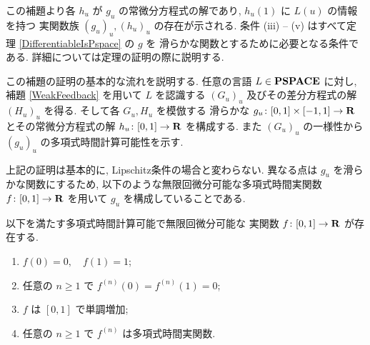  この補題より各 $h_u$ が $g_u$ の常微分方程式の解であり, 
 $h_u(1)$ に $L(u)$ の情報を持つ
 実関数族 $(g_u)_u, (h_u)_u$ の存在が示される.
 条件 (iii) -- (v) はすべて定理 \ref{DifferentiableIsPspace} の $g$ を
 滑らかな関数とするために必要となる条件である.
 詳細については定理の証明の際に説明する.
 

 この補題の証明の基本的な流れを説明する.
 任意の言語 $L \in \mathbf{PSPACE}$ に対し, 
 補題 \ref{WeakFeedback} を用いて $L$ を認識する $(G_u)_u$ 
 及びその差分方程式の解 $(H_u)_u$ を得る.
 そして各 $G_u, H_u$ を模倣する
 滑らかな $g_u \colon [0,1] \times [-1, 1] \to \mathbf R$ 
 とその常微分方程式の解 $h_u \colon [0,1] \to \mathbf R$ を構成する.
 また $(G_u)_u$ の一様性から $(g_u)_u$ の多項式時間計算可能性を示す.


 上記の証明は基本的に, Lipschitz条件の場合と変わらない.
 異なる点は $g_u$ を滑らかな関数にするため, 
 以下のような無限回微分可能な多項式時間実関数 $f \colon [0,1] \to \mathbf R$ を用いて
 $g_u$ を構成していることである.

 \begin{lemma}
  \label{SmoothFunction}
  以下を満たす多項式時間計算可能で無限回微分可能な
  実関数 $f \colon [0,1] \to \mathbf R$ が存在する.
  \begin{enumerate}
   \item $f(0) = 0, \quad f(1) = 1$;
   \item 任意の $n \ge 1$ で $f^{(n)}(0) = f^{(n)}(1) = 0$;
   \item $f$ は $[0,1]$ で単調増加;
   \item 任意の $n \ge 1$ で $f^{(n)}$ は多項式時間実関数.
  \end{enumerate}
 \end{lemma} 


